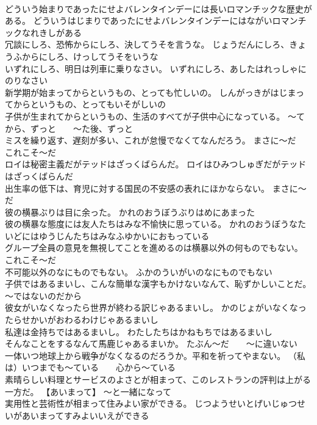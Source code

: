 \documentclass[8pt]{extreport}
\begin{document}
\begin{CJK}{UTF8}{min}
\\	どういう始まりであったにせよバレンタインデーには長いロマンチックな歴史がある。	どういうはじまりであったにせよバレンタインデーにはながいロマンチックなれきしがある 
\\	冗談にしろ、恐怖からにしろ、決してうそを言うな。	じょうだんにしろ、きょうふからにしろ、けっしてうそをいうな 
\\	いずれにしろ、明日は列車に乗りなさい。	いずれにしろ、あしたはれっしゃにのりなさい 
\\	新学期が始まってからというもの、とっても忙しいの。	しんがっきがはじまってからというもの、とってもいそがしいの 
\\	子供が生まれてからというもの、生活のすべてが子供中心になっている。	～てから、ずっと　　～た後、ずっと
\\	ミスを繰り返す、遅刻が多い、これが怠慢でなくてなんだろう。	まさに～だ　　これこそ～だ
\\	ロイは秘密主義だがテッドはざっくばらんだ。	ロイはひみつしゅぎだがテッドはざっくばらんだ 
\\	出生率の低下は、育児に対する国民の不安感の表れにほかならない。	まさに～だ
\\	彼の横暴ぶりは目に余った。	かれのおうぼうぶりはめにあまった 
\\	彼の横暴な態度には友人たちはみな不愉快に思っている。	かれのおうぼうなたいどにはゆうじんたちはみなふゆかいにおもっている 
\\	グループ全員の意見を無視してことを進めるのは横暴以外の何ものでもない。	これこそ～だ
\\	不可能以外のなにものでもない。	ふかのういがいのなにものでもない 
\\	子供ではあるまいし、こんな簡単な漢字もかけないなんて、恥ずかしいことだ。	～ではないのだから
\\	彼女がいなくなったら世界が終わる訳じゃあるまいし。	かのじょがいなくなったらせかいがおわるわけじゃあるまいし 
\\	私達は金持ちではあるまいし。	わたしたちはかねもちではあるまいし 
\\	そんなことをするなんて馬鹿じゃあるまいか。	たぶん～だ　　～に違いない
\\	一体いつ地球上から戦争がなくなるのだろうか。平和を祈ってやまない。	（私は）いつまでも～ている　　心から～ている
\\	素晴らしい料理とサービスのよさとが相まって、このレストランの評判は上がる一方だ。	【あいまって】 ～と一緒になって
\\	実用性と芸術性が相まって住みよい家ができる。	じつようせいとげいじゅつせいがあいまってすみよいいえができる 

\end{CJK}
\end{document}
